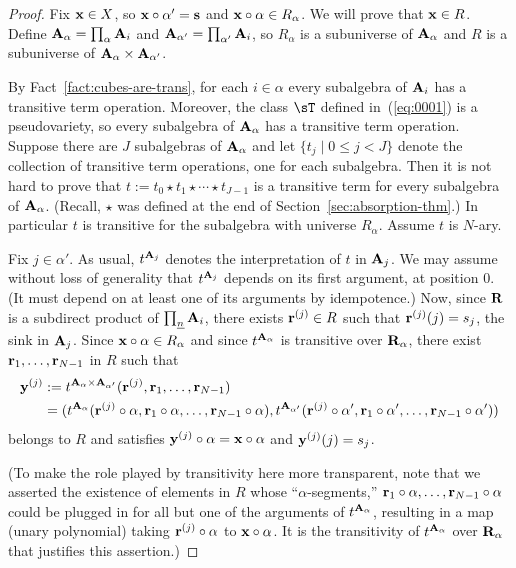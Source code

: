 \begin{proof}
  Fix $\mathbf{x} \in X$, so $\mathbf{x}\circ \alpha' = \mathbf{s}$ and $\mathbf{x} \circ \alpha \in R_\alpha$. 
  We will prove that $\mathbf{x} \in R$.
  Define $\mathbf{A}_{\alpha} =\prod_{\alpha}\mathbf{A}_i$ and $\mathbf{A}_{\alpha'} =\prod_{\alpha'}\mathbf{A}_i$, so 
  $R_{\alpha}$ is a subuniverse of $\mathbf{A}_\alpha$ and $R$ is a subuniverse of
  $\mathbf{A}_\alpha \times \mathbf{A}_{\alpha'}$.

  By Fact~\ref{fact:cubes-are-trans}, 
  for each $i \in \alpha$ every subalgebra of $\mathbf{A}_i$
  has a transitive term operation.  Moreover, the class $\sT$ defined in~(\ref{eq:0001}) 
  is a pseudovariety, so every subalgebra of 
  $\mathbf{A}_{\alpha}$ has a transitive term operation.  Suppose there are $J$ subalgebras 
  of $\mathbf{A}_{\alpha}$ and let $\{t_j\mid 0\leq j < J\}$ denote the collection
  of transitive term operations, one for each subalgebra. %
  Then it is not hard to prove that 
  $t := t_0 \star  t_1 \star \cdots \star  t_{J-1}$
  is a transitive term for every subalgebra of $\mathbf{A}_\alpha$.
  (Recall, $\star$ was defined at the end of Section~\ref{sec:absorption-thm}.)  
  In particular $t$ is transitive for the subalgebra with universe $R_{\alpha}$. 
  Assume $t$ is $N$-ary.
  
  Fix $j\in \alpha'$.  As usual, $t^{\mathbf{A}_j}$ denotes the interpretation of 
  $t$ in $\mathbf{A}_j$. We may assume without loss of generality that $t^{\mathbf{A}_j}$ 
  depends on its first argument, at position 0. (It must depend on at least one of
  its arguments by idempotence.) 
  Now, since $\mathbf{R}$ is a subdirect product of $\prod_{\underline{n}}\mathbf{A}_i$, 
  there exists $\mathbf{r}^{(j)} \in R$ such that $\mathbf{r}^{(j)}(j) = s_j$, the sink in $\mathbf{A}_j$.  
  Since   $\mathbf{x}\circ \alpha\in R_\alpha$ and since $t^{\mathbf{A}_\alpha}$
  is transitive over $\mathbf{R}_\alpha$, there exist
  $\mathbf{r}_1, \dots, \mathbf{r}_{N-1}$ in $R$ such that 
  \begin{align*}
   \mathbf{y}^{(j)}&:= t^{\mathbf{A}_{\alpha} \times \mathbf{A}_{\alpha'}}(\mathbf{r}^{(j)}, \mathbf{r}_1, \dots, \mathbf{r}_{N-1})\\
      &= 
    (t^{\mathbf{A}_{\alpha}}(\mathbf{r}^{(j)}\circ \alpha, \mathbf{r}_1\circ \alpha, \dots, \mathbf{r}_{N-1}\circ \alpha),
    t^{\mathbf{A}_{\alpha'}}(\mathbf{r}^{(j)}\circ \alpha', \mathbf{r}_1\circ \alpha', \dots, \mathbf{r}_{N-1}\circ \alpha'))
  \end{align*}
  belongs to $R$  and satisfies
  $\mathbf{y}^{(j)}\circ \alpha = \mathbf{x} \circ \alpha$ and
  $\mathbf{y}^{(j)}(j) = s_j$.

  (To make the role played by transitivity here
  more transparent, note that we asserted the existence of elements in $R$
  whose ``$\alpha$-segments,'' $\mathbf{r}_1\circ \alpha, \dots, \mathbf{r}_{N-1}\circ \alpha$
  could be plugged in for all but one of the arguments of $t^{\mathbf{A}_\alpha}$, 
  resulting in a map (unary polynomial) taking $\mathbf{r}^{(j)}\circ \alpha$ to
  $\mathbf{x}\circ \alpha$. It is the transitivity of $t^{\mathbf{A}_\alpha}$ over $\mathbf{R}_\alpha$
  that justifies this assertion.)


\end{proof}
